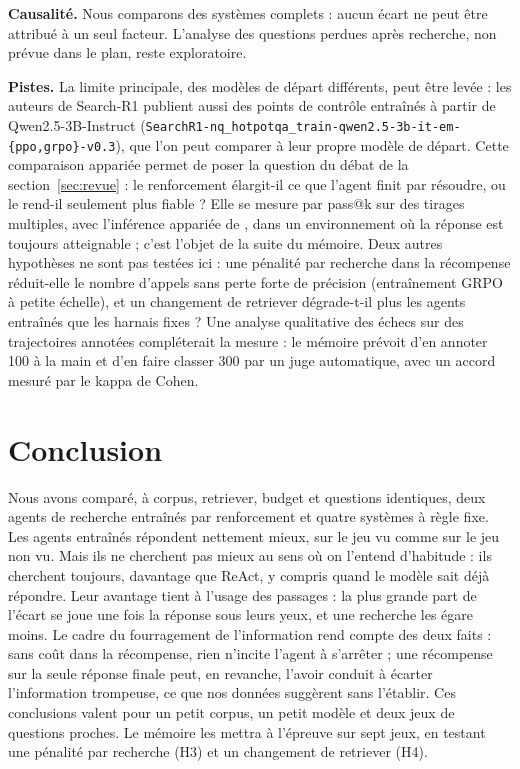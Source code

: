 \documentclass[11pt,a4paper]{article}
\newif\iffictif
\newcommand{\fictifnote}[1]{\iffictif\par\noindent\fcolorbox{red}{red!4}{\parbox{\dimexpr\linewidth-2\fboxsep-2\fboxrule}{\small\textcolor{red!70!black}{\textbf{Données fictives.} #1}}}\par\medskip\fi}
\begin{document}
\noindent\textbf{Causalité.} Nous comparons des systèmes complets : aucun écart ne peut être attribué à un seul facteur. L'analyse des questions perdues après recherche, non prévue dans le plan, reste exploratoire.

\textbf{Pistes.} La limite principale, des modèles de départ différents, peut être levée : les auteurs de Search-R1 publient aussi des points de contrôle entraînés à partir de Qwen2.5-3B-Instruct (\texttt{SearchR1-nq\_hotpotqa\_train-qwen2.5-3b-it-em-\{ppo,grpo\}-v0.3}), que l'on peut comparer à leur propre modèle de départ. Cette comparaison appariée permet de poser la question du débat de la section~\ref{sec:revue} : le renforcement élargit-il ce que l'agent finit par résoudre, ou le rend-il seulement plus fiable ? Elle se mesure par pass@k sur des tirages multiples, avec l'inférence appariée de \citet{yang2026crossovers}, dans un environnement où la réponse est toujours atteignable ; c'est l'objet de la suite du mémoire. Deux autres hypothèses ne sont pas testées ici : une pénalité par recherche dans la récompense réduit-elle le nombre d'appels sans perte forte de précision (entraînement GRPO à petite échelle), et un changement de retriever dégrade-t-il plus les agents entraînés que les harnais fixes ? Une analyse qualitative des échecs sur des trajectoires annotées compléterait la mesure : le mémoire prévoit d'en annoter 100 à la main et d'en faire classer 300 par un juge automatique, avec un accord mesuré par le kappa de Cohen.

\FloatBarrier
\section{Conclusion}\label{sec:conclusion}
\fictifnote{Conclusion écrite sur les résultats fictifs.}
Nous avons comparé, à corpus, retriever, budget et questions identiques, deux agents de recherche entraînés par renforcement et quatre systèmes à règle fixe. Les agents entraînés répondent nettement mieux, sur le jeu vu comme sur le jeu non vu. Mais ils ne cherchent pas mieux au sens où on l'entend d'habitude : ils cherchent toujours, davantage que ReAct, y compris quand le modèle sait déjà répondre. Leur avantage tient à l'usage des passages : la plus grande part de l'écart se joue une fois la réponse sous leurs yeux, et une recherche les égare moins. Le cadre du fourragement de l'information rend compte des deux faits : sans coût dans la récompense, rien n'incite l'agent à s'arrêter ; une récompense sur la seule réponse finale peut, en revanche, l'avoir conduit à écarter l'information trompeuse, ce que nos données suggèrent sans l'établir. Ces conclusions valent pour un petit corpus, un petit modèle et deux jeux de questions proches. Le mémoire les mettra à l'épreuve sur sept jeux, en testant une pénalité par recherche (H3) et un changement de retriever (H4).
\end{document}
